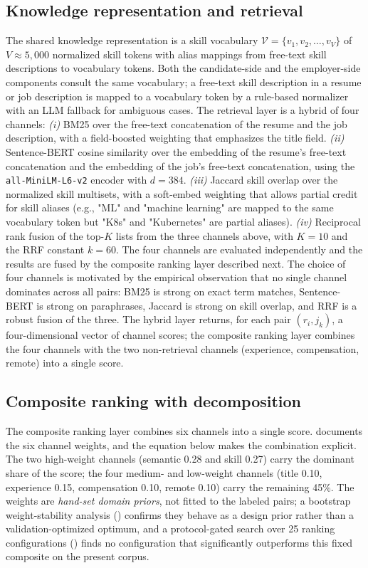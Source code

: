 \subsection{Knowledge representation and retrieval}\label{sec:3.4}
The shared knowledge representation is a skill vocabulary $\mathcal{V} = \{v_1, v_2, \ldots, v_V\}$ of $V \approx 5{,}000$ normalized skill tokens with alias mappings from free-text skill descriptions to vocabulary tokens.
Both the candidate-side and the employer-side components consult the same vocabulary; a free-text skill description in a resume or job description is mapped to a vocabulary token by a rule-based normalizer with an LLM fallback for ambiguous cases.
The retrieval layer is a hybrid of four channels:
\emph{(i)} BM25 \citep{robertson1995okapi} over the free-text concatenation of the resume and the job description, with a field-boosted weighting that emphasizes the title field.
\emph{(ii)} Sentence-BERT cosine similarity \citep{reimers2019sentence} over the embedding of the resume's free-text concatenation and the embedding of the job's free-text concatenation, using the \texttt{all-MiniLM-L6-v2} encoder with $d = 384$.
\emph{(iii)} Jaccard skill overlap over the normalized skill multisets, with a soft-embed weighting that allows partial credit for skill aliases (e.g., "ML" and "machine learning" are mapped to the same vocabulary token but "K8s" and "Kubernetes" are partial aliases).
\emph{(iv)} Reciprocal rank fusion \citep{cormack2010reciprocal} of the top-$K$ lists from the three channels above, with $K = 10$ and the RRF constant $k = 60$.
The four channels are evaluated independently and the results are fused by the composite ranking layer described next.
The choice of four channels is motivated by the empirical observation that no single channel dominates across all pairs: BM25 is strong on exact term matches, Sentence-BERT is strong on paraphrases, Jaccard is strong on skill overlap, and RRF is a robust fusion of the three.
The hybrid layer returns, for each pair $(r_i, j_k)$, a four-dimensional vector of channel scores; the composite ranking layer combines the four channels with the two non-retrieval channels (experience, compensation, remote) into a single score.

\subsection{Composite ranking with decomposition}\label{sec:3.5}
The composite ranking layer combines six channels into a single score.
 documents the six channel weights, and the equation below makes the combination explicit.
The two high-weight channels (semantic 0.28 and skill 0.27) carry the dominant share of the score; the four medium- and low-weight channels (title 0.10, experience 0.15, compensation 0.10, remote 0.10) carry the remaining 45\%.
The weights are \emph{hand-set domain priors}, not fitted to the labeled pairs; a bootstrap weight-stability analysis () confirms they behave as a design prior rather than a validation-optimized optimum, and a protocol-gated search over 25 ranking configurations () finds no configuration that significantly outperforms this fixed composite on the present corpus.

